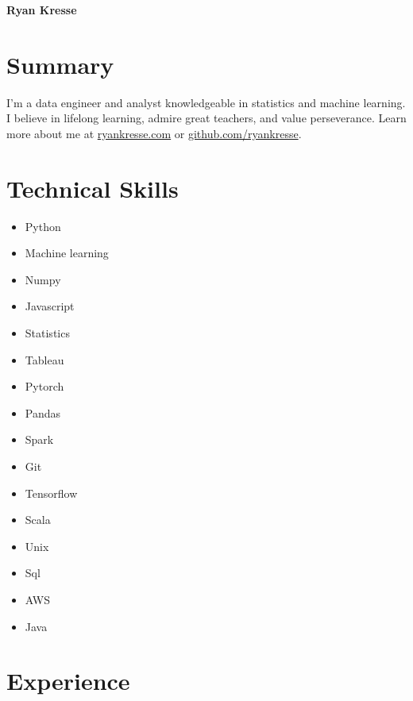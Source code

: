 \documentclass[11pt]{article}
\begin{document}
	\noindent \textbf{{\fontsize{38pt}{\parskip}\selectfont \color{RyanRed} Ryan Kresse}}
	\smallskip


	\section{Summary}
		I'm a data engineer and analyst knowledgeable in statistics and machine learning. I believe in lifelong learning, admire great teachers, and value perseverance. Learn more about me at \href{http://ryankresse.com/blog}{ryankresse.com} or \href{https://github.com/ryankresse}{github.com/ryankresse}.
	\section{Technical Skills}
		\begin{multicols}{4}
			\begin{itemize}
				\item Python
				\item Machine learning
				\item Numpy
				\item Javascript

				\columnbreak
				\item Statistics
				\item Tableau
				\item Pytorch
				\item Pandas

				\columnbreak
				\item Spark
				\item Git
				\item Tensorflow
				\item Scala

				\columnbreak
				\item Unix
				\item Sql
				\item AWS
				\item Java

				\columnbreak

			\end{itemize}
		\end{multicols}



	\section{Experience}
\end{document}
